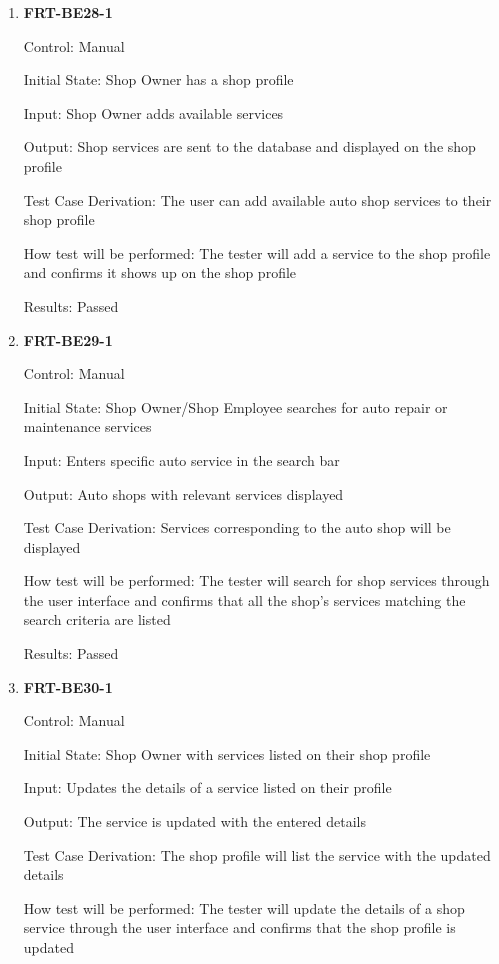 \documentclass[12pt, titlepage]{article}
\begin{document}
\begin{enumerate}

	\item \textbf{FRT-BE28-1}

	      Control: Manual

	      Initial State: Shop Owner has a shop profile

	      Input: Shop Owner adds available services

	      Output: Shop services are sent to the database and displayed on the shop profile

	      Test Case Derivation: The user can add available auto shop services to their shop profile

	      How test will be performed: The tester will add a service to the shop profile and confirms it shows
	      up on the shop profile

	      Results: Passed

	\item \textbf{FRT-BE29-1}

	      Control: Manual

	      Initial State: Shop Owner/Shop Employee searches for auto repair or maintenance services

	      Input: Enters specific auto service in the search bar

	      Output: Auto shops with relevant services displayed

	      Test Case Derivation: Services corresponding to the auto shop will be displayed

	      How test will be performed: The tester will search for shop services through the user interface and
	      confirms that all the shop's services matching the search criteria are listed

	      Results: Passed

	\item \textbf{FRT-BE30-1}

	      Control: Manual

	      Initial State: Shop Owner with services listed on their shop profile

	      Input: Updates the details of a service listed on their profile

	      Output: The service is updated with the entered details

	      Test Case Derivation: The shop profile will list the service with the updated details

	      How test will be performed: The tester will update the details of a shop service through the user
	      interface and confirms that the shop profile is updated


\end{enumerate}
\end{document}
